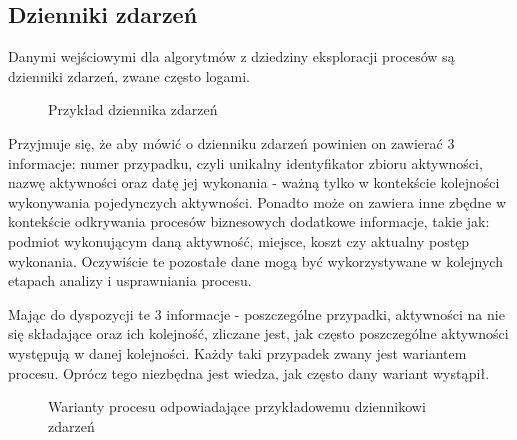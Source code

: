 \subsection{Dzienniki zdarzeń}
\label{sec:event_logs}
Danymi wejściowymi dla algorytmów z dziedziny eksploracji procesów są dzienniki zdarzeń, zwane często logami.
 
\begin{figure}[h]
	\caption{\label{fig:event_log_example}Przykład dziennika zdarzeń}
\end{figure}

Przyjmuje się, że aby mówić o dzienniku zdarzeń powinien on zawierać 3 informacje: numer przypadku, czyli unikalny identyfikator zbioru aktywności, nazwę aktywności oraz datę jej wykonania - ważną tylko w kontekście kolejności wykonywania pojedynczych aktywności. Ponadto może on zawiera inne zbędne w kontekście odkrywania procesów biznesowych dodatkowe informacje, takie jak: podmiot wykonującym daną aktywność, miejsce, koszt czy aktualny postęp wykonania. Oczywiście te pozostałe dane mogą być wykorzystywane w kolejnych etapach analizy i usprawniania procesu.

Mając do dyspozycji te 3 informacje - poszczególne przypadki, aktywności na nie się składające oraz ich kolejność, zliczane jest, jak często poszczególne aktywności występują w danej kolejności. Każdy taki przypadek zwany jest wariantem procesu. Oprócz tego niezbędna jest wiedza, jak często dany wariant wystąpił.

\begin{figure}[h]
	\caption{\label{fig:process_variants_example}Warianty procesu odpowiadające przykładowemu dziennikowi zdarzeń}
\end{figure}


